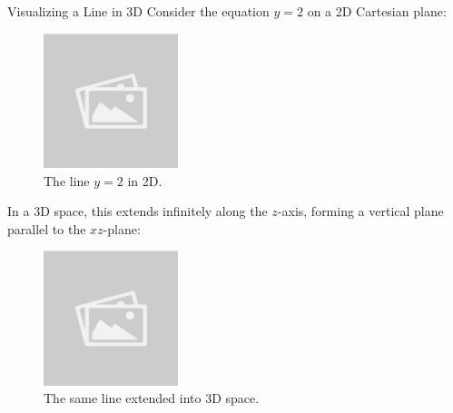 \documentclass{article}
\begin{document}
\begin{examplebox}{Visualizing a Line in 3D}
Consider the equation \( y = 2 \) on a 2D Cartesian plane:

\begin{figure}[H]
    \centering
    \includegraphics[width=0.35\textwidth]{sample_image.jpg}
    \caption{The line \( y = 2 \) in 2D.}
    \label{fig:line_2d}
\end{figure}

In a 3D space, this extends infinitely along the \( z \)-axis, forming a vertical plane parallel to the \( xz \)-plane:

\begin{figure}[H]
    \centering
    \includegraphics[width=0.35\textwidth]{sample_image.jpg}
    \caption{The same line extended into 3D space.}
    \label{fig:line_3d}
\end{figure}

\end{examplebox}
\end{document}
